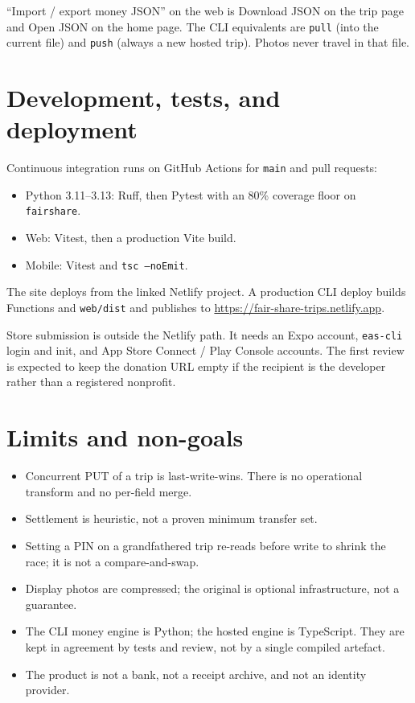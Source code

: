 \documentclass[11pt,a4paper]{article}
\newcommand{\code}[1]{\texttt{#1}}
\begin{document}
``Import / export money JSON'' on the web is Download JSON on the trip page and Open JSON on the home page.
The CLI equivalents are \code{pull} (into the current file) and \code{push} (always a new hosted trip).
Photos never travel in that file.

\section{Development, tests, and deployment}

Continuous integration runs on GitHub Actions for \code{main} and pull requests:

\begin{itemize}[leftmargin=1.6em,itemsep=0.2em]
  \item Python 3.11--3.13: Ruff, then Pytest with an 80\% coverage floor on \code{fairshare}.
  \item Web: Vitest, then a production Vite build.
  \item Mobile: Vitest and \code{tsc --noEmit}.
\end{itemize}

The site deploys from the linked Netlify project.
A production CLI deploy builds Functions and \code{web/dist} and publishes to \url{https://fair-share-trips.netlify.app}.

Store submission is outside the Netlify path.
It needs an Expo account, \code{eas-cli} login and init, and App Store Connect / Play Console accounts.
The first review is expected to keep the donation URL empty if the recipient is the developer rather than a registered nonprofit.

\section{Limits and non-goals}

\begin{itemize}[leftmargin=1.6em,itemsep=0.35em]
  \item Concurrent PUT of a trip is last-write-wins.
        There is no operational transform and no per-field merge.
  \item Settlement is heuristic, not a proven minimum transfer set.
  \item Setting a PIN on a grandfathered trip re-reads before write to shrink the race; it is not a compare-and-swap.
  \item Display photos are compressed; the original is optional infrastructure, not a guarantee.
  \item The CLI money engine is Python; the hosted engine is TypeScript.
        They are kept in agreement by tests and review, not by a single compiled artefact.
  \item The product is not a bank, not a receipt archive, and not an identity provider.
\end{itemize}
\end{document}
